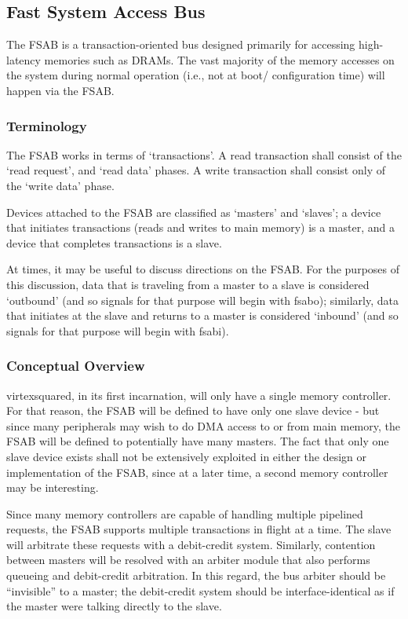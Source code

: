 \documentclass[10pt]{report}
\begin{document}
\subsection{Fast System Access Bus}

\label{sec:fsab}

The FSAB is a transaction-oriented bus designed primarily for accessing high-
latency memories such as DRAMs. The vast majority of the memory accesses on 
the system during normal operation (i.e., not at boot/ configuration time) 
will happen via the FSAB. 

\subsubsection{Terminology}

The FSAB works in terms of `transactions'. A read transaction shall consist 
of the `read request', and `read data' phases. A write transaction shall 
consist only of the `write data' phase.

Devices attached to the FSAB are classified as `masters' and `slaves'; a 
device that initiates transactions (reads and writes to main memory) is a 
master, and a device that completes transactions is a slave.

At times, it may be useful to discuss directions on the FSAB. For the purposes
of this discussion, data that is traveling from a master to a slave is 
considered `outbound' (and so signals for that purpose will begin with fsabo); 
similarly, data that initiates at the slave and returns to a master is 
considered `inbound' (and so signals for that purpose will begin with fsabi).


\subsubsection{Conceptual Overview}

virtexsquared, in its first incarnation, will only have a single memory 
controller. For that reason, the FSAB will be defined to have only one slave 
device - but since many peripherals may wish to do DMA access to or from main 
memory, the FSAB will be defined to potentially have many masters. The fact 
that only one slave device exists shall not be extensively exploited in either 
the design or implementation of the FSAB, since at a later time, a second 
memory controller may be interesting.

Since many memory controllers are capable of handling multiple pipelined 
requests, the FSAB supports multiple transactions in flight at a time. The 
slave will arbitrate these requests with a debit-credit system. Similarly, 
contention between masters will be resolved with an arbiter module that also 
performs queueing and debit-credit arbitration. In this regard, the bus 
arbiter should be ``invisible'' to a master; the debit-credit system should be 
interface-identical as if the master were talking directly to the slave.
\end{document}
